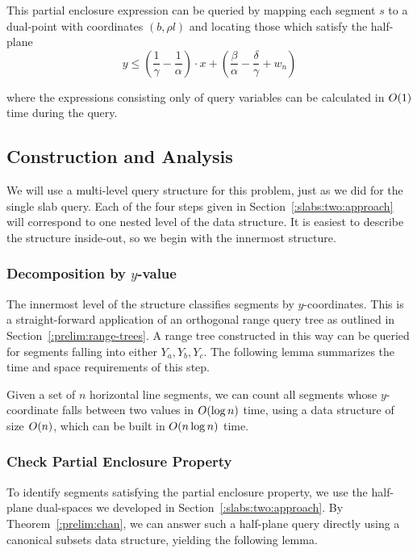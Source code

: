 This partial enclosure expression can be queried by mapping each segment $s$ to a dual-point with coordinates $(b, \rho l)$ and locating those which satisfy the half-plane
\[
y \leq \left ( \frac{1}{\gamma} - \frac{1}{\alpha} \right ) \cdot x + \left ( \frac{\beta}{\alpha} - \frac{\delta}{\gamma} + w_n \right )
\]

\noindent where the expressions consisting only of query variables can be calculated in $O\!\left(1\right)$ time during the query.


\subsection{Construction and Analysis}
\label{:slabs:two:analysis}

We will use a multi-level query structure for this problem, just as we did for the single slab query.
Each of the four steps given in Section~\ref{:slabs:two:approach} will correspond to one nested level of the data structure.
It is easiest to describe the structure inside-out, so we begin with the innermost structure.

\subsubsection{Decomposition by $y$-value}

The innermost level of the structure classifies segments by $y$-coordinates. This is a straight-forward application of an orthogonal range query tree as outlined in Section~\ref{:prelim:range-trees}. 
A range tree constructed in this way can be queried for segments falling into either $Y_a, Y_b, Y_c$. 
The following lemma summarizes the time and space requirements of this step.

\begin{lemma}
\label{lem:slabs:two:step1}
Given a set of $n$ horizontal line segments, we can count all segments whose $y$-coordinate falls between two values in $O\!\left(\log{n}\right)$ time, using a data structure of size $O\!\left(n\right)$, which can be built in $O\!\left(n\log{n}\right)$ time.
\end{lemma}


\subsubsection{Check Partial Enclosure Property}

To identify segments satisfying the partial enclosure property, we use the half-plane dual-spaces we developed in Section~\ref{:slabs:two:approach}. 
By Theorem~\ref{:prelim:chan}, we can answer such a half-plane query directly using a canonical subsets data structure, yielding the following lemma.

